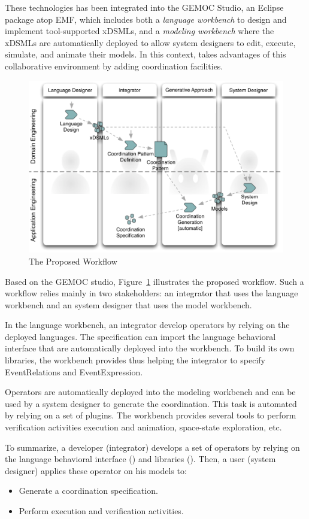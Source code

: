 These technologies has been integrated into the GEMOC Studio, an Eclipse package atop EMF, which includes both a \emph{language workbench} to design and implement tool-supported xDSMLs, and a \emph{modeling workbench} where the xDSMLs are automatically deployed to allow system designers to edit, execute, simulate, and animate their models. In this context, \bcool takes advantages of this collaborative environment by adding coordination facilities. 

\begin{figure}[h]
	\begin{center}
		\includegraphics[width=.6\textwidth]{bcool/figs/process}
		\caption{The Proposed Workflow}
		\label{fig:proposedworkflow}
	\end{center}
\end{figure}

Based on the GEMOC studio, Figure~\ref{fig:proposedworkflow} illustrates the proposed workflow. Such a workflow relies mainly in two stakeholders: an integrator that uses the language workbench and an system designer that uses the model workbench. 

In the language workbench, an integrator develop operators by relying on the deployed languages. The \bcool specification can import the language behavioral interface that are automatically deployed into the workbench. To build its own libraries, the workbench provides \moccml thus helping the integrator to specify EventRelations and EventExpression. 

Operators are automatically deployed into the modeling workbench and can be used by a system designer to generate the coordination. This task is automated by relying on a set of plugins. The workbench provides several tools to perform verification activities \eg execution and animation, space-state exploration, etc.  

To summarize, a \bcool developer (\ie integrator) develops a set of operators by relying on the language behavioral interface (\ecl) and libraries (\moccml). Then, a \bcool user (\ie system designer) applies these operator on his models to: 
		\begin{itemize}
			\item Generate a coordination specification.
			\item Perform execution and verification activities.
		\end{itemize}

